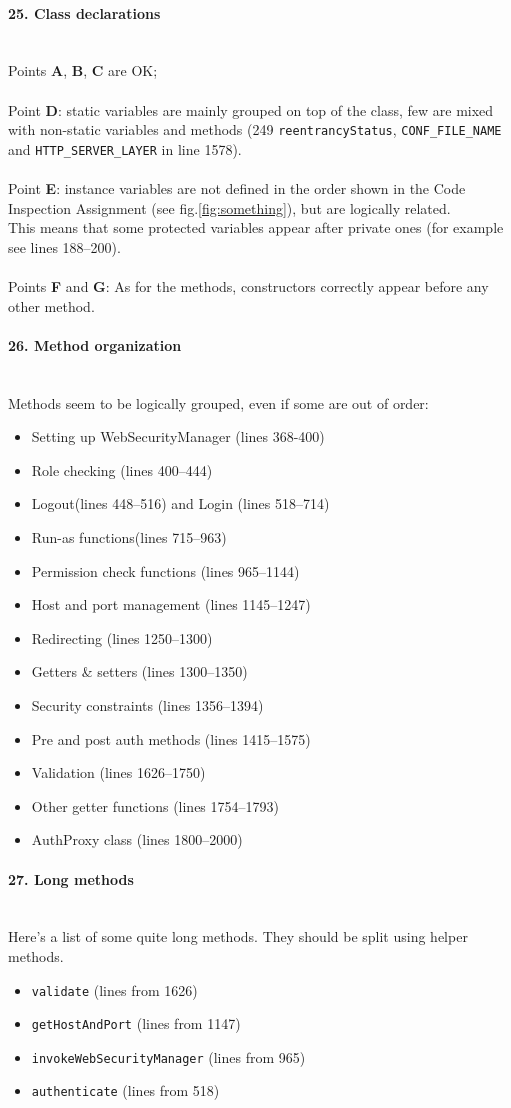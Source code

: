 \documentclass[english]{article}
\newcommand{\code}[1]{\texttt{#1}}
\newcommand{\issue}[3][?]{
    \paragraph{#1. #2} \mbox{}\\ #3
}
\begin{document}
\issue[25]{Class declarations} {
    Points \textbf{A}, \textbf{B}, \textbf{C} are OK; \\ \\
    Point \textbf{D}: static variables are mainly grouped on top of 
    the class, few are mixed with non-static variables and methods 
    (249 \code{reentrancyStatus}, \code{CONF\_FILE\_NAME} and
    \code{HTTP\_SERVER\_LAYER} in line 1578). \\ \\ 
    Point \textbf{E}: instance variables are not 
    defined in the order shown in the Code Inspection Assignment 
    (see fig.\ref{fig:something}), but are logically related. \\
    This means that some protected variables appear after private ones 
    (for example see lines 188--200). \\ \\ 
    Points \textbf{F} and \textbf{G}: As for the methods, constructors correctly appear before any 
    other method.
}

\issue[26]{Method organization} {
Methods seem to be logically grouped, even if some are out of order: 
\begin{itemize}
    \item Setting up WebSecurityManager (lines 368-400)
    \item Role checking (lines 400--444)
    \item Logout(lines 448--516) and Login (lines 518--714)
    \item Run-as functions(lines 715--963)
    \item Permission check functions (lines 965--1144)
    \item Host and port management (lines 1145--1247)
    \item Redirecting (lines 1250--1300)
    \item Getters \& setters (lines 1300--1350)
    \item Security constraints (lines 1356--1394)
    \item Pre and post auth methods (lines 1415--1575)
    \item Validation (lines 1626--1750)
    \item Other getter functions (lines 1754--1793)
    \item AuthProxy class (lines 1800--2000) 
\end{itemize}
}

\issue[27]{Long methods} {
    Here's a list of some quite long methods. 
    They should be split using helper methods.
    \begin{itemize} 
        \item \code{validate} (lines from 1626)
        \item \code{getHostAndPort} (lines from 1147)
        \item \code{invokeWebSecurityManager} (lines from 965)
        \item \code{authenticate} (lines from 518) 
    \end{itemize}
}
\end{document}
